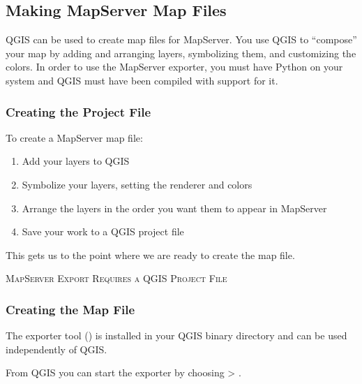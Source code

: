 \subsection{Making MapServer Map Files}\label{sec:mapserver_export}

\updatedisclaimer

QGIS can be used to create map files for MapServer. You use QGIS to
``compose'' your map by adding and arranging layers, symbolizing them, and
customizing the colors. In order to use the MapServer exporter, you must have Python on your
system and QGIS must have been compiled with support for it.

\subsubsection{Creating the Project File}

To create a MapServer map file:

\begin{enumerate}
\item Add your layers to QGIS
\item Symbolize your layers, setting the renderer and colors
\item Arrange the layers in the order you want them to appear in MapServer
\item Save your work to a QGIS project file
\end{enumerate} 

This gets us to the point where we are ready to create the map file.

\begin{Tip}\caption{\textsc{MapServer Export Requires a QGIS Project File}}
\end{Tip} 

\subsubsection{Creating the Map File}

The exporter tool () is installed in your QGIS binary directory and can be used independently of QGIS. 

From QGIS you can start the exporter by choosing  > . 

